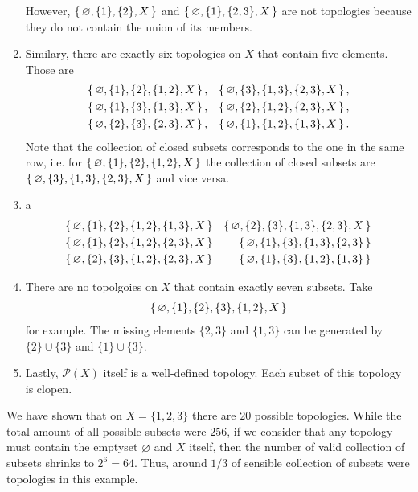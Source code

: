 \begin{example}
\begin{enumerate}
        However, \(\left\{\, \varnothing, \{1\}, \{2\}, X \,\right\}\) and \(\left\{\, \varnothing, \{1\}, \{2, 3\}, X \,\right\}\) are not topologies because they do not contain the union of its members.
        \item Similary, there are exactly six topologies on \(X\) that contain five elements. Those are
        \begin{align*}
            \left\{\, \varnothing, \{1\}, \{2\}, \{1, 2\}, X \,\right\}, & & \left\{\, \varnothing, \{3\}, \{1, 3\}, \{2, 3\}, X \,\right\}, \\
            \left\{\, \varnothing, \{1\}, \{3\}, \{1, 3\}, X \,\right\}, & & \left\{\, \varnothing, \{2\}, \{1, 2\}, \{2, 3\}, X \,\right\}, \\
            \left\{\, \varnothing, \{2\}, \{3\}, \{2, 3\}, X \,\right\}, & & \left\{\, \varnothing, \{1\}, \{1, 2\}, \{1, 3\}, X \,\right\} \text{.}
        \end{align*}
        Note that the collection of closed subsets corresponds to the one in the same row, i.e. for \(\left\{\, \varnothing, \{1\}, \{2\}, \{1, 2\}, X \,\right\}\) the collection of closed subsets are \(\left\{\, \varnothing, \{3\}, \{1, 3\}, \{2, 3\}, X \,\right\}\) and vice versa.
        \item a
        \begin{align*}
            \left\{\, \varnothing, \{1\}, \{2\}, \{1, 2\}, \{1, 3\}, X \,\right\} & & \left\{\, \varnothing, \{2\}, \{3\}, \{1,3\}, \{2, 3\}, X \,\right\} \\
            \left\{\, \varnothing, \{1\}, \{2\}, \{1, 2\}, \{2, 3\}, X \,\right\} & & \left\{\, \varnothing, \{1\}, \{3\}, \{1, 3\}, \{2, 3\} \,\right\} \\
            \left\{\, \varnothing, \{2\}, \{3\}, \{1, 2\}, \{2, 3\}, X \,\right\} & & \left\{\, \varnothing, \{1\}, \{3\}, \{1, 2\}, \{1, 3\} \,\right\}
        \end{align*}
        \item There are no topolgoies on \(X\) that contain exactly seven subsets. Take
        \begin{align*}
            \left\{\, \varnothing, \{1\}, \{2\}, \{3\}, \{1, 2\}, X \,\right\}
        \end{align*}
        for example. The missing elements \(\{2, 3\}\) and \(\{1, 3\}\) can be generated by \(\{2\} \cup \{3\}\) and \(\{1\} \cup \{3\}\).
        \item Lastly, \(\mathcal{P}(X)\) itself is a well-defined topology. Each subset of this topology is clopen.
    \end{enumerate}
    We have shown that on \(X = \{1, 2, 3\}\) there are \(20\) possible topologies. While the total amount of all possible subsets were \(256\), if we consider that any topology must contain the emptyset \(\varnothing\) and \(X\) itself, then the number of valid collection of subsets shrinks to \(2^6 = 64\). Thus, around \(1/3\) of sensible collection of subsets were topologies in this example.
\end{example}
